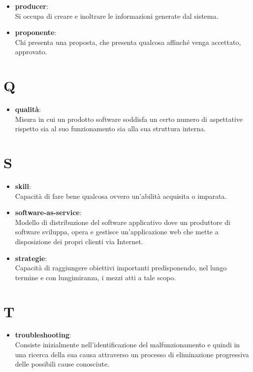 \documentclass[a4paper, oneside, openany, dvipsnames, table]{article}
\begin{document}
\begin{itemize}
\item \textbf{producer}:\\	Si occupa di creare e inoltrare le informazioni generate dal sistema.
\end{itemize}

\begin{itemize}
\item \textbf{proponente}:\\	Chi presenta una proposta, che presenta qualcosa affinché venga accettato, approvato.
\end{itemize}

\newpage
\section{Q}
\begin{itemize}
\item \textbf{qualità}:\\	Misura in cui un prodotto software soddisfa un certo numero di aspettative rispetto sia al suo funzionamento sia alla sua struttura interna.
\end{itemize}

\newpage
\section{S}
\begin{itemize}
\item \textbf{skill}:\\	Capacità di fare bene qualcosa ovvero un'abilità acquisita o imparata.
\end{itemize}

\begin{itemize}
\item \textbf{software-as-service}:\\	Modello di distribuzione del software applicativo dove un produttore di software sviluppa, opera e gestisce un'applicazione web che mette a disposizione dei propri clienti via Internet.
\end{itemize}

\begin{itemize}
\item \textbf{strategie}:\\	Capacità di raggiungere obiettivi importanti predisponendo, nel lungo termine e con lungimiranza, i mezzi atti a tale scopo.
\end{itemize}


\newpage
\section{T}
\begin{itemize}
\item \textbf{troubleshooting}:\\	Consiste inizialmente nell'identificazione del malfunzionamento e quindi in una ricerca della sua causa attraverso un processo di eliminazione progressiva delle possibili cause conosciute.
\end{itemize}
\end{document}
